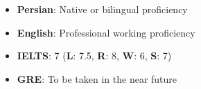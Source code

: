 %
%
%



\vspace{5pt}
\begin{itemize}
  \item \textbf{Persian}: Native or bilingual proficiency
  \item \textbf{English}: Professional working proficiency
\end{itemize}

\vspace{10pt}

\vspace{5pt}
\begin{itemize}
  \item \textbf{IELTS}: 7 (\textbf{L}: 7.5, \textbf{R}: 8, \textbf{W}: 6, \textbf{S}: 7)
  \item \textbf{GRE}: To be taken in the near future
\end{itemize}

